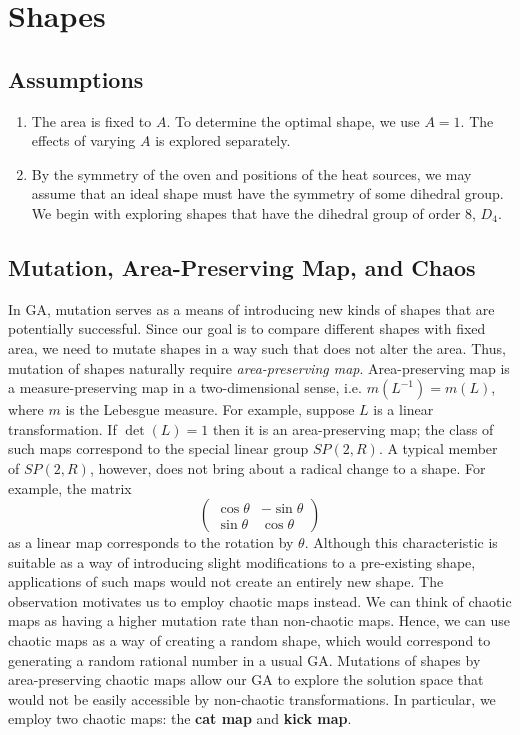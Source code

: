 \documentclass[12pt]{article}
\begin{document}
\section{Shapes}

\subsection{Assumptions}
\begin{enumerate}
  \item The area is fixed to $A$. To determine the optimal shape, we use $A=1$. The effects of varying $A$ is explored separately.
  \item By the symmetry of the oven and positions of the heat sources, we may assume that an ideal shape must have the symmetry of some dihedral group. We begin with exploring shapes that have the dihedral group of order 8, $D_4$.
\end{enumerate}

\subsection{Mutation, Area-Preserving Map, and Chaos}
In GA, mutation serves as a means of introducing new kinds of shapes that are potentially successful.
Since our goal is to compare different shapes with fixed area, we need to mutate shapes in a way such that does not alter the area.
Thus, mutation of shapes naturally require \textit{area-preserving map}.
Area-preserving map is a measure-preserving map in a two-dimensional sense, i.e. $m(L^{-1}) = m(L)$, where $m$ is the Lebesgue measure.
For example, suppose $L$ is a linear transformation.
If $\det(L) = 1$ then it is an area-preserving map; the class of such maps correspond to the special linear group $SP(2,R)$.
A typical member of $SP(2,R)$, however, does not bring about a radical change to a shape.
For example, the matrix
\begin{equation*}
\begin{pmatrix}
    \cos\theta & -\sin\theta  \\
    \sin\theta & \cos\theta  
  \end{pmatrix}
\end{equation*}
as a linear map corresponds to the rotation by $\theta$. 
Although this characteristic is suitable as a way of introducing slight modifications to a pre-existing shape, applications of such maps would not create an entirely new shape.
The observation motivates us to employ chaotic maps instead.
We can think of chaotic maps as having a higher mutation rate than non-chaotic maps.
Hence, we can use chaotic maps as a way of creating a random shape, which would correspond to generating a random rational number in a usual GA.
Mutations of shapes by area-preserving chaotic maps allow our GA to explore the solution space that would not be easily accessible by non-chaotic transformations.
In particular, we employ two chaotic maps: the \textbf{cat map} and \textbf{kick map}.
\end{document}
